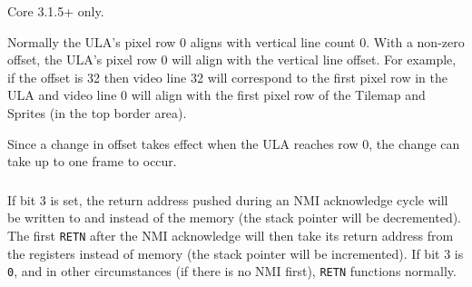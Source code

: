 Core 3.1.5+ only.

Normally the ULA's pixel row 0 aligns with vertical line count 0. With a non-zero offset, the ULA's pixel row 0 will align with the vertical line offset. For example, if the offset is 32 then video line 32 will correspond to the first pixel row in the ULA and video line 0 will align with the first pixel row of the Tilemap and Sprites (in the top border area).

Since a change in offset takes effect when the ULA reaches row 0, the change can take up to one frame to occur.


\subsubsection{}

\begin{NextPort}
\end{NextPort}

If bit 3 is set, the return address pushed during an NMI acknowledge cycle will be written to  and  instead of the memory (the stack pointer will be decremented). The first {\tt RETN} after the NMI acknowledge will then take its return address from the registers instead of memory (the stack pointer will be incremented). If bit 3 is {\tt 0}, and in other circumstances (if there is no NMI first), {\tt RETN} functions normally.


\subsubsection{}
\vspace*{-2ex}
\subsubsection{}

\begin{NextPort}
\end{NextPort}


